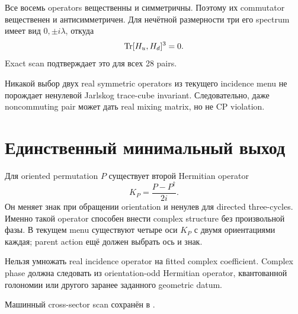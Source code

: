 Все восемь operators вещественны и симметричны. Поэтому их commutator
вещественен и антисимметричен. Для нечётной размерности три его spectrum имеет
вид \(0,\pm i\lambda\), откуда
\begin{equation}
\operatorname{Tr}[H_u,H_d]^3=0.
\end{equation}
Exact scan подтверждает это для всех 28 pairs.

\begin{theorem}
Никакой выбор двух real symmetric operators из текущего incidence menu не
порождает ненулевой Jarlskog trace-cube invariant. Следовательно, даже
noncommuting pair может дать real mixing matrix, но не CP violation.
\end{theorem}

\section{Единственный минимальный выход}

Для oriented permutation \(P\) существует второй Hermitian operator
\begin{equation}
K_P=\frac{P-P^\dagger}{2i}.
\end{equation}
Он меняет знак при обращении orientation и ненулев для directed three-cycles.
Именно такой operator способен внести complex structure без произвольной
фазы. В текущем menu существуют четыре оси \(K_P\) с двумя ориентациями
каждая; parent action ещё должен выбрать ось и знак.

\begin{nogocriterion}
Нельзя умножать real incidence operator на fitted complex coefficient.
Complex phase должна следовать из orientation-odd Hermitian operator,
квантованной голономии или другого заранее заданного geometric datum.
\end{nogocriterion}

Машинный cross-sector scan сохранён в
.